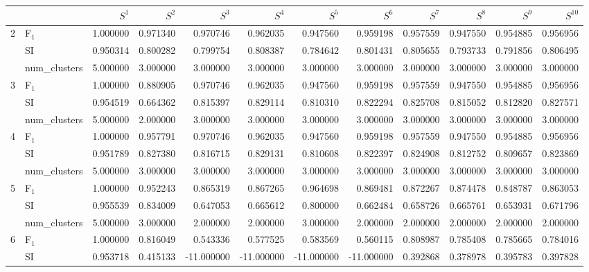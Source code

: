 \begin{tabular}{llrrrrrrrrrr}
\toprule
 &  & $S^{1}$ & $S^{2}$ & $S^{3}$ & $S^{4}$ & $S^{5}$ & $S^{6}$ & $S^{7}$ & $S^{8}$ & $S^{9}$ & $S^{10}$ \\
\midrule
\multirow[c]{3}{*}{2} & F$_1$ & 1.000000 & 0.971340 & 0.970746 & 0.962035 & 0.947560 & 0.959198 & 0.957559 & 0.947550 & 0.954885 & 0.956956 \\
 & SI & 0.950314 & 0.800282 & 0.799754 & 0.808387 & 0.784642 & 0.801431 & 0.805655 & 0.793733 & 0.791856 & 0.806495 \\
 & num_clusters & 5.000000 & 3.000000 & 3.000000 & 3.000000 & 3.000000 & 3.000000 & 3.000000 & 3.000000 & 3.000000 & 3.000000 \\
\multirow[c]{3}{*}{3} & F$_1$ & 1.000000 & 0.880905 & 0.970746 & 0.962035 & 0.947560 & 0.959198 & 0.957559 & 0.947550 & 0.954885 & 0.956956 \\
 & SI & 0.954519 & 0.664362 & 0.815397 & 0.829114 & 0.810310 & 0.822294 & 0.825708 & 0.815052 & 0.812820 & 0.827571 \\
 & num_clusters & 5.000000 & 2.000000 & 3.000000 & 3.000000 & 3.000000 & 3.000000 & 3.000000 & 3.000000 & 3.000000 & 3.000000 \\
\multirow[c]{3}{*}{4} & F$_1$ & 1.000000 & 0.957791 & 0.970746 & 0.962035 & 0.947560 & 0.959198 & 0.957559 & 0.947550 & 0.954885 & 0.956956 \\
 & SI & 0.951789 & 0.827380 & 0.816715 & 0.829131 & 0.810608 & 0.822397 & 0.824908 & 0.812752 & 0.809657 & 0.823869 \\
 & num_clusters & 5.000000 & 3.000000 & 3.000000 & 3.000000 & 3.000000 & 3.000000 & 3.000000 & 3.000000 & 3.000000 & 3.000000 \\
\multirow[c]{3}{*}{5} & F$_1$ & 1.000000 & 0.952243 & 0.865319 & 0.867265 & 0.964698 & 0.869481 & 0.872267 & 0.874478 & 0.848787 & 0.863053 \\
 & SI & 0.955539 & 0.834009 & 0.647053 & 0.665612 & 0.800000 & 0.662484 & 0.658726 & 0.665761 & 0.653931 & 0.671796 \\
 & num_clusters & 5.000000 & 3.000000 & 2.000000 & 2.000000 & 3.000000 & 2.000000 & 2.000000 & 2.000000 & 2.000000 & 2.000000 \\
\multirow[c]{3}{*}{6} & F$_1$ & 1.000000 & 0.816049 & 0.543336 & 0.577525 & 0.583569 & 0.560115 & 0.808987 & 0.785408 & 0.785665 & 0.784016 \\
 & SI & 0.953718 & 0.415133 & -11.000000 & -11.000000 & -11.000000 & -11.000000 & 0.392868 & 0.378978 & 0.395783 & 0.397828 \\

\end{tabular}
